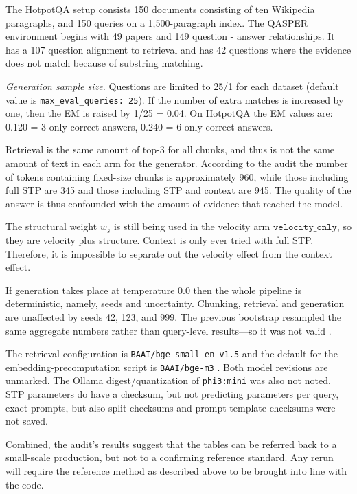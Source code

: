 \documentclass[10pt,a4paper]{article}
\begin{document}
The HotpotQA setup consists 150 documents consisting of ten Wikipedia paragraphs, and 150 queries on a 1,500-paragraph index. The QASPER environment begins with 49 papers and 149 question - answer relationships. It has a 107 question alignment to retrieval and has 42 questions where the evidence does not match because of substring matching.

\textit{Generation sample size.} Questions are limited to 25/1 for each dataset (default value is \texttt{max\_eval\_queries: 25}). If the number of extra matches is increased by one, then the EM is raised by 1/25 = 0.04. On HotpotQA the EM values are: 0.120 = 3 only correct answers, 0.240 = 6 only correct answers.

Retrieval is the same amount of top-$3$ for all chunks, and thus is not the same amount of text in each arm for the generator. According to the audit the number of tokens containing fixed-size chunks is approximately 960, while those including full STP are 345 and those including STP and context are 945. The quality of the answer is thus confounded with the amount of evidence that reached the model.

The structural weight $w_s$ is still being used in the velocity arm $\texttt{velocity\_only}$, so they are velocity plus structure. Context is only ever tried with full STP. Therefore, it is impossible to separate out the velocity effect from the context effect.

If generation takes place at temperature 0.0 then the whole pipeline is deterministic, namely, seeds and uncertainty. Chunking, retrieval and generation are unaffected by seeds 42, 123, and 999. The previous bootstrap resampled the same aggregate numbers rather than query-level results—so it was not valid \cite{efron1993bootstrap}.

The retrieval configuration is \texttt{BAAI/bge-small-en-v1.5} \cite{xiao2023cpack} and the default for the embedding-precomputation script is \texttt{BAAI/bge-m3} \cite{chen2024bgem3}. Both model revisions are unmarked. The Ollama digest/quantization of \texttt{phi3:mini} \cite{abdin2024phi3} was also not noted. STP parameters do have a checksum, but not predicting parameters per query, exact prompts, but also split checksums and prompt-template checksums were not saved.

Combined, the audit's results suggest that the tables can be referred back to a small-scale production, but not to a confirming reference standard. Any rerun will require the reference method as described above to be brought into line with the code.
\end{document}
